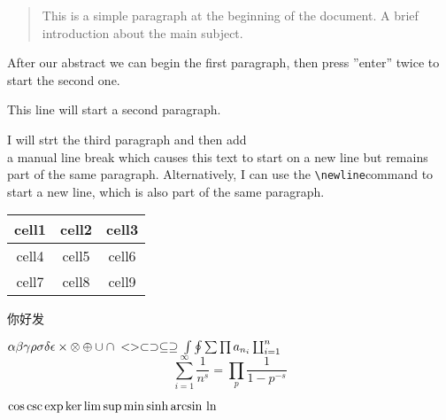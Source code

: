 \documentclass[12pt, letterpaper]{article}
\begin{document}
\begin{abstract} %
This is a simple paragraph at the beginning of the
document. A brief introduction about the main subject.
\end{abstract}

After our abstract we can begin the first paragraph, then press ''enter''
twice to start the second one.

This line will start a second paragraph.

I will strt the third paragraph and then add \\ a manual line break which
causes this text to start on a new line but remains part of the same
paragraph. Alternatively, I can use the \verb|\newline|\newline command to
start a new line, which is also part of the same paragraph.

\begin{center}
\begin{tabular}{|c|c|c|}
    \hline
    cell1 & cell2 & cell3 \\
    \hline
    cell4 & cell5 & cell6 \\
    \hline
    cell7 & cell8 & cell9 \\
    \hline
\end{tabular}
\end{center}

\begin{CJK}{UTF8}{gkai}
    你好发
\end{CJK}

\begin{math}
    \alpha \beta \gamma \rho \sigma \delta \epsilon \\
    \times \otimes \oplus \cup \cap \\
    < > \subset \supset \subseteq \supseteq \\
    \int \oint \sum \prod \\
    a_{n_i}  \coprod_{i=1}^n
\end{math}
\[\sum_{i=1}^{\infty}\frac{1}{n^s} = \prod_p\frac{1}{1 - p ^ {-s}}\]

\begin{math}
    \cos \csc \exp \ker \limsup \min \sinh \arcsin \\
    \ln
\end{math}
\end{document}
